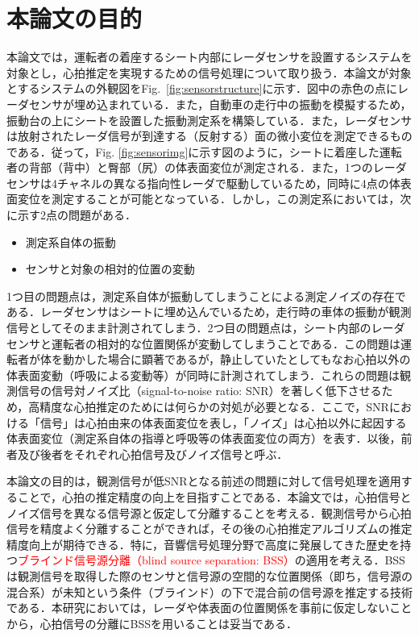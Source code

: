 \section{本論文の目的}
本論文では，運転者の着座するシート内部にレーダセンサを設置するシステムを対象とし，心拍推定を実現するための信号処理について取り扱う．本論文が対象とするシステムの外観図をFig.~\ref{fig:sensorstructure}に示す．図中の赤色の点にレーダセンサが埋め込まれている．また，自動車の走行中の振動を模擬するため，振動台の上にシートを設置した振動測定系を構築している．また，レーダセンサは放射されたレーダ信号が到達する（反射する）面の微小変位を測定できるものである．従って，Fig. \ref{fig:sensorimg}に示す図のように，シートに着座した運転者の背部（背中）と臀部（尻）の体表面変位が測定される．また，1つのレーダセンサは4チャネルの異なる指向性レーダで駆動しているため，同時に4点の体表面変位を測定することが可能となっている．しかし，この測定系においては，次に示す2点の問題がある．
\begin{itemize}
	\item 測定系自体の振動
	\item センサと対象の相対的位置の変動
\end{itemize}
1つ目の問題点は，測定系自体が振動してしまうことによる測定ノイズの存在である．レーダセンサはシートに埋め込んでいるため，走行時の車体の振動が観測信号としてそのまま計測されてしまう．2つ目の問題点は，シート内部のレーダセンサと運転者の相対的な位置関係が変動してしまうことである．この問題は運転者が体を動かした場合に顕著であるが，静止していたとしてもなお心拍以外の体表面変動（呼吸による変動等）が同時に計測されてしまう．これらの問題は観測信号の信号対ノイズ比（signal-to-noise ratio: SNR）を著しく低下させるため，高精度な心拍推定のためには何らかの対処が必要となる．ここで，SNRにおける「信号」は心拍由来の体表面変位を表し，「ノイズ」は心拍以外に起因する体表面変位（測定系自体の指導と呼吸等の体表面変位の両方）を表す．以後，前者及び後者をそれぞれ心拍信号及びノイズ信号と呼ぶ．

本論文の目的は，観測信号が低SNRとなる前述の問題に対して信号処理を適用することで，心拍の推定精度の向上を目指すことである．本論文では，心拍信号とノイズ信号を異なる信号源と仮定して分離することを考える．観測信号から心拍信号を精度よく分離することができれば，その後の心拍推定アルゴリズムの推定精度向上が期待できる．特に，音響信号処理分野で高度に発展してきた歴史を持つ\textcolor{red}{ブラインド信号源分離（blind source separation: BSS）}\cite{originica, ica2}の適用を考える．BSSは観測信号を取得した際のセンサと信号源の空間的な位置関係（即ち，信号源の混合系）が未知という条件（ブラインド）の下で混合前の信号源を推定する技術である．本研究においては，レーダや体表面の位置関係を事前に仮定しないことから，心拍信号の分離にBSSを用いることは妥当である．

